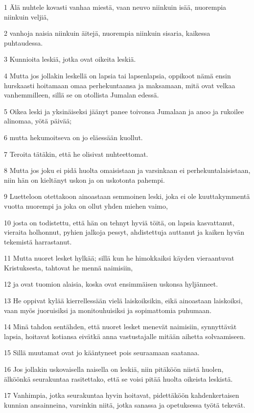 \par 1 Älä nuhtele kovasti vanhaa miestä, vaan neuvo niinkuin isää, nuorempia niinkuin veljiä,
\par 2 vanhoja naisia niinkuin äitejä, nuorempia niinkuin sisaria, kaikessa puhtaudessa.
\par 3 Kunnioita leskiä, jotka ovat oikeita leskiä.
\par 4 Mutta jos jollakin leskellä on lapsia tai lapsenlapsia, oppikoot nämä ensin hurskaasti hoitamaan omaa perhekuntaansa ja maksamaan, mitä ovat velkaa vanhemmilleen, sillä se on otollista Jumalan edessä.
\par 5 Oikea leski ja yksinäiseksi jäänyt panee toivonsa Jumalaan ja anoo ja rukoilee alinomaa, yötä päivää;
\par 6 mutta hekumoitseva on jo eläessään kuollut.
\par 7 Teroita tätäkin, että he olisivat nuhteettomat.
\par 8 Mutta jos joku ei pidä huolta omaisistaan ja varsinkaan ei perhekuntalaisistaan, niin hän on kieltänyt uskon ja on uskotonta pahempi.
\par 9 Luetteloon otettakoon ainoastaan semmoinen leski, joka ei ole kuuttakymmentä vuotta nuorempi ja joka on ollut yhden miehen vaimo,
\par 10 josta on todistettu, että hän on tehnyt hyviä töitä, on lapsia kasvattanut, vieraita holhonnut, pyhien jalkoja pessyt, ahdistettuja auttanut ja kaiken hyvän tekemistä harrastanut.
\par 11 Mutta nuoret lesket hylkää; sillä kun he himokkaiksi käyden vieraantuvat Kristuksesta, tahtovat he mennä naimisiin,
\par 12 ja ovat tuomion alaisia, koska ovat ensimmäisen uskonsa hyljänneet.
\par 13 He oppivat kylää kierrellessään vielä laiskoiksikin, eikä ainoastaan laiskoiksi, vaan myös juoruisiksi ja monitouhuisiksi ja sopimattomia puhumaan.
\par 14 Minä tahdon sentähden, että nuoret lesket menevät naimisiin, synnyttävät lapsia, hoitavat kotiansa eivätkä anna vastustajalle mitään aihetta solvaamiseen.
\par 15 Sillä muutamat ovat jo kääntyneet pois seuraamaan saatanaa.
\par 16 Jos jollakin uskovaisella naisella on leskiä, niin pitäköön niistä huolen, älköönkä seurakuntaa rasitettako, että se voisi pitää huolta oikeista leskistä.
\par 17 Vanhimpia, jotka seurakuntaa hyvin hoitavat, pidettäköön kahdenkertaisen kunnian ansainneina, varsinkin niitä, jotka sanassa ja opetuksessa työtä tekevät.
